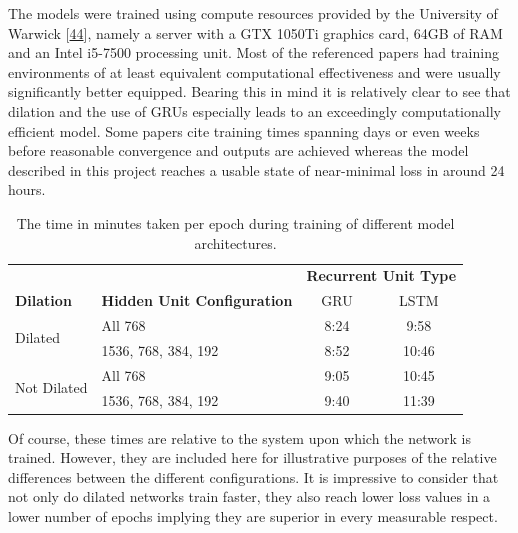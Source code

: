 \documentclass[12pt,]{article}
\begin{document}
The models were trained using compute resources provided by the
University of Warwick
{[}\protect\hyperlink{ref-warwickcomputenodes}{44}{]}, namely a server
with a GTX 1050Ti graphics card, 64GB of RAM and an Intel i5-7500
processing unit. Most of the referenced papers had training environments
of at least equivalent computational effectiveness and were usually
significantly better equipped. Bearing this in mind it is relatively
clear to see that dilation and the use of GRUs especially leads to an
exceedingly computationally efficient model. Some papers cite training
times spanning days or even weeks before reasonable convergence and
outputs are achieved whereas the model described in this project reaches
a usable state of near-minimal loss in around 24 hours.

\setlength\extrarowheight{1pt}
\begin{table}[H]
\centering
\caption{The time in minutes taken per epoch during training of different model architectures.}
\vspace{1em}
\begin{tabular}{llcc} 
\toprule
                             &                                    & \multicolumn{2}{c}{\textbf{Recurrent Unit Type}}  \\
\textbf{Dilation}            & \textbf{Hidden Unit Configuration} & GRU   & LSTM                                      \\ 
\hline
\multirow{2}{*}{Dilated}     & All 768                            & 8:24  & 9:58                                      \\ 
                             & 1536, 768, 384, 192                & 8:52  & 10:46                                     \\ 
\multirow{2}{*}{Not Dilated} & All 768                            & 9:05  & 10:45                                     \\ 
                             & 1536, 768, 384, 192                & 9:40  & 11:39                                     \\
\bottomrule
\end{tabular}
\end{table}

Of course, these times are relative to the system upon which the network
is trained. However, they are included here for illustrative purposes of
the relative differences between the different configurations. It is
impressive to consider that not only do dilated networks train faster,
they also reach lower loss values in a lower number of epochs implying
they are superior in every measurable respect.
\end{document}
